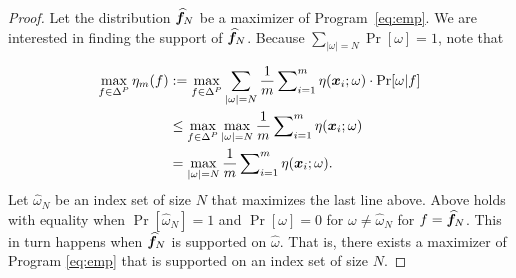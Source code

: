     \begin{frame}
    \begin{proof}
    Let the distribution $\widehat{{\bm{f}}}_N$ be a maximizer of Program~\ref{eq:emp}. We are interested in finding the support of $\widehat{{\bm{f}}}_N$. Because $\sum_{|\omega|=N}\Pr[\omega]=1$, note that 
    
    \begin{align}
    \max_{f\in \Delta^P}  \eta_m(f) & := \max_{f\in \Delta^P}  \sum_{|\omega|=N}  \frac{1}{m}\sum\nolimits_{i=1}^m\eta({\bm{x}}_{i};\omega) \cdot \Pr[\omega|f]\nonumber\\ 
    & \le \max_{f\in \Delta^P} \max_{|\omega|=N} \frac{1}{m}\sum\nolimits_{i=1}^m\eta({\bm{x}}_{i}; \omega) \nonumber\\
    & = \max_{|\omega|=N}   \frac{1}{m}\sum\nolimits_{i=1}^m\eta({\bm{x}}_{i};\omega). 
    \end{align}
    Let $\widehat{\omega}_N$ be an index set of size $N$ that maximizes the last line above. 
    Above holds with equality when $\Pr[\widehat{\omega}_N]=1$ and $\Pr[\omega]=0$ for $\omega\ne \widehat{\omega}_N$ for $f=\widehat{{\bm{f}}}_N$. This in turn happens when $\widehat{{\bm{f}}}_N$ is  supported on $\widehat{\omega}$. That is, there exists a maximizer of Program \ref{eq:emp} that is supported on an index set of size $N$. 
    \end{proof}\vspace{-.2cm}
    \end{frame}
    
